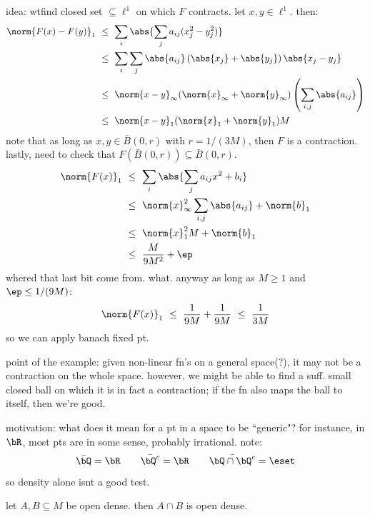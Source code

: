 \begin{xmp}[source=Primary Source Material]
	idea: wtfind closed set $\subseteq\ell^{1}$ on which $F$ contracts.
	let $x,y\in\ell^{1}$. then:
	\begin{align*}
		\norm{F(x)-F(y)}_{1}
		& \ \leq \ \sum_{i}\abs{\sum_{j}a_{ij}(x_{j}^{2}-y_{j}^{2})} \\
		& \ \leq \ \sum_{i}\sum_{j}\abs{a_{ij}}\left(\abs{x_{j}}+\abs{y_{j}}\right)\abs{x_{j}-y_{j}} \\
		& \ \leq \ \norm{x-y}_{\infty}(\norm{x}_{\infty}+\norm{y}_{\infty})\left(\sum_{i,j}\abs{a_{ij}}\right) \\
		& \ \leq \ \norm{x-y}_{1}(\norm{x}_{1}+\norm{y}_{1})M
	\end{align*}
	note that as long as $x,y\in \bar{B}(0,r)$ with $r=1/(3M)$, then $F$ is a contraction.
	lastly, need to check that $F(\bar{B}(0,r))\subseteq\bar{B}(0,r)$.
	\begin{align*}
		\norm{F(x)}_{1}
		& \ \leq \ \sum_{i}\abs{\sum_{j}a_{ij}x^{2}+b_{i}} \\
		& \ \leq \ \norm{x}_{\infty}^{2}\sum_{i,j}\abs{a_{ij}}+\norm{b}_{1} \\
		& \ \leq \ \norm{x}_{1}^{2}M + \norm{b}_{1} \\
		& \ \leq \ \frac{M}{9M^{2}}+\ep
	\end{align*}
	whered that last bit come from. what.
	anyway as long as $M\geq1$ and $\ep\leq1/(9M)$:
	\begin{equation*}
		\norm{F(x)}_{1} \ \leq \ \frac{1}{9M}+\frac{1}{9M} \ \leq \ \frac{1}{3M}
	\end{equation*}
	so we can apply banach fixed pt.
\end{xmp}
point of the example: given non-linear fn's on a general space(?), it
may not be a contraction on the whole space.
however, we might be able to find a suff. small closed ball on which it is
in fact a contraction; if the fn also maps the ball to itself, then we're good.



motivation: what does it mean for a pt in a space to be ``generic"?
for instance, in $\bR$, most pts are in some sense, probably irrational.
note:
\begin{equation*}
	\bar{\bQ}=\bR \qquad \bar{\bQ^{c}}=\bR \qquad \bar{\bQ\cap\bQ^{c}}=\eset
\end{equation*}
so density alone isnt a good test.

\begin{lm}
	let $A,B\subseteq M$ be open dense. then $A\cap B$ is open dense.
\end{lm} \

